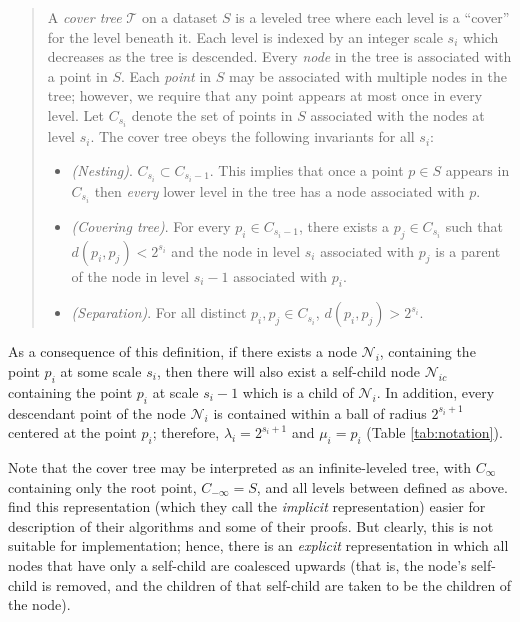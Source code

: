 \begin{quote}
A {\it cover tree} $\mathscr{T}$ on a dataset $S$ is a leveled tree where each
level is a ``cover'' for the level beneath it.  Each level is indexed by an
integer scale $s_i$ which decreases as the tree is descended.  Every {\it node}
in the tree is associated with a point in $S$.  Each {\it point} in $S$ may be
associated with multiple nodes in the tree; however, we require that any point
appears at most once in every level.  Let $C_{s_i}$ denote the set of points in
$S$ associated with the nodes at level $s_i$.  The cover tree obeys the
following invariants for all $s_i$:

\begin{itemize}
  \item {\em (Nesting)}. $C_{s_i} \subset C_{s_i - 1}$.  This implies that once a
point $p \in S$ appears in $C_{s_i}$ then {\it every} lower level in the tree
has a node associated with $p$.

  \item {\em (Covering tree)}. For every $p_i \in C_{s_i - 1}$, there exists a
$p_j \in C_{s_i}$ such that $d(p_i, p_j) < 2^{s_i}$ and the node in level $s_i$
associated with $p_j$ is a parent of the node in level $s_i - 1$ associated with
$p_i$.

  \item {\em (Separation)}.  For all distinct $p_i, p_j \in C_{s_i}$, $d(p_i,
p_j) > 2^{s_i}$.
\end{itemize}
\end{quote}

As a consequence of this definition, if there exists a node $\mathscr{N}_i$,
containing the point $p_i$ at some scale $s_i$, then there will also exist a
self-child node $\mathscr{N}_{ic}$ containing the point $p_i$ at scale $s_i - 1$
which is a child of $\mathscr{N}_i$.  In addition, every descendant point of the
node $\mathscr{N}_i$ is contained within a ball of radius $2^{s_i + 1}$ centered
at the point $p_i$; therefore, $\lambda_i = 2^{s_i + 1}$ and $\mu_i = p_i$
(Table \ref{tab:notation}).

Note that the cover tree may be interpreted as an infinite-leveled tree, with
$C_{\infty}$ containing only the root point, $C_{-\infty} = S$, and all levels
between defined as above.  \citet{langford2006} find
this representation (which they call the {\it implicit} representation) easier
for description of their algorithms and some of their proofs.  But clearly,
this is not suitable for implementation; hence, there is an {\it explicit}
representation in which all nodes that have only a self-child are coalesced
upwards (that is, the node's self-child is removed, and the children of that
self-child are taken to be the children of the node).  %

